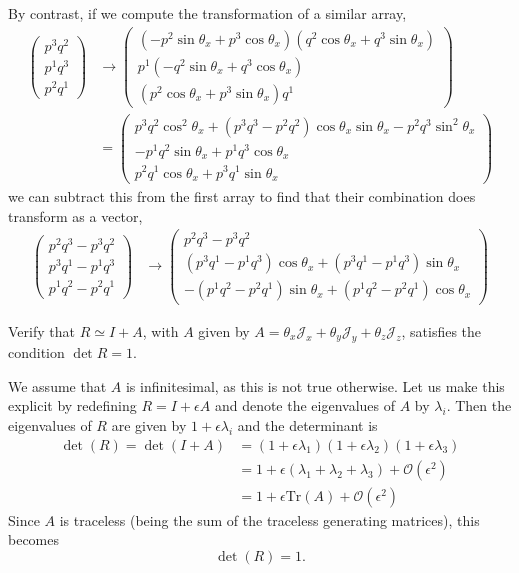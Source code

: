 \documentclass[../group-theory-in-a-nutshell-for-physicists.tex]{subfiles}
\begin{document}
\begin{questions}
\begin{solution}
	By contrast, if we compute the transformation of a similar array, 
	\begin{align*}
		\begin{pmatrix}
			p^{3}q^{2} \\
			p^{1}q^{3} \\
			p^{2}q^{1}
		\end{pmatrix} &\to \begin{pmatrix}
			(-p^2\sin\theta_x + p^3\cos\theta_x)(q^2\cos\theta_x + q^3\sin\theta_x) \\
			p^{1}(-q^2\sin\theta_x + q^3\cos\theta_x) \\
			(p^2\cos\theta_x + p^3\sin\theta_x)q^{1}
		\end{pmatrix} \\
	&= \begin{pmatrix}
		p^3q^2\cos^2\theta_x + (p^3q^3 - p^2q^2)\cos\theta_x\sin\theta_x - p^2q^3\sin^2\theta_x \\
		-p^{1}q^2\sin\theta_x + p^1q^3\cos\theta_x \\
		p^2q^1\cos\theta_x + p^3q^1\sin\theta_x
	\end{pmatrix}
	\end{align*}
	we can subtract this from the first array to find that their combination does transform as a vector,
	\begin{align*}
		\begin{pmatrix}
			p^{2}q^{3} - p^{3}q^{2} \\
			p^{3}q^{1} - p^{1}q^{3} \\
			p^{1}q^{2} - p^{2}q^{1}
		\end{pmatrix} &\to \begin{pmatrix}
			p^2q^3 - p^3q^2 \\
			(p^3q^1 - p^1q^3)\cos\theta_x + (p^3q^1 - p^1q^3)\sin\theta_x \\
			-(p^1q^2 - p^2q^1)\sin\theta_x + (p^1q^2 - p^2q^1)\cos\theta_x
	\end{pmatrix}
	\end{align*}
\end{solution}

\question Verify that $R \simeq I + A$, with $A$ given by
$A = \theta_{x}\mathcal{J}_{x} + \theta_{y}\mathcal{J}_{y} + \theta_{z}\mathcal{J}_{z}$,
satisfies the condition $\det R = 1$.

\begin{solution}
	We assume that $A$ is infinitesimal, as this is not true otherwise. Let us make this explicit by redefining $R = I + \epsilon{A}$ and denote the eigenvalues of $A$ by $\lambda_i$. Then the eigenvalues of $R$ are given by $1 + \epsilon\lambda_i$ and the determinant is
	\begin{align*}
		\det(R) = \det(I + A) &= (1 + \epsilon\lambda_1)(1 + \epsilon\lambda_2)(1 + \epsilon\lambda_3) \\
		&= 1 + \epsilon(\lambda_1 + \lambda_2 + \lambda_3) + \mathcal{O}(\epsilon^2) \\
		&= 1 + \epsilon\mathrm{Tr}(A) + \mathcal{O}(\epsilon^2)
	\end{align*}
	Since $A$ is traceless (being the sum of the traceless generating matrices), this becomes
	\[
		\det(R) = 1.
	\]
\end{solution}


\end{questions}
\end{document}
